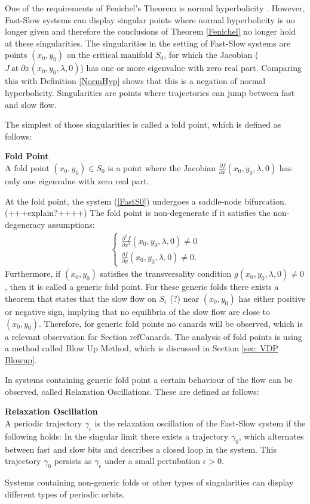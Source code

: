 
One of the requirements of Fenichel's Theorem is normal hyperbolicity \citep{Kuehn}. However, Fast-Slow systems can display singular points where normal hyperbolicity is no longer given and therefore the conclusions of Theorem \ref{Fenichel} no longer hold at these singularities.
The singularities in the setting of Fast-Slow systems are points $(x_0,y_0)$ on the critical manifold $S_0$, for which the Jacobian ($ J \ \text{at} \ {\partial x}(x_0,y_0, \lambda, 0)$) has one or more eigenvalue with zero real part. Comparing this with Definition \ref{NormHyp} shows that this is a negation of normal hyperbolicity. Singularities are points where trajectories can jump between fast and slow flow. 

The simplest of those singularities is called a fold point, which is defined as follows:
\begin{definition}{\textbf{Fold Point}} \label{FoldDef} \\
A fold point $(x_0,y_0) \in S_0$ is a point where the Jacobian $ \frac{\partial f}{\partial x}(x_0,y_0, \lambda, 0)$ has only one eigenvalue with zero real part.
\end{definition}
At the fold point, the system (\ref{FastS0}) undergoes a saddle-node bifurcation. (+++explain?++++)
The fold point is non-degenerate if it satisfies the non-degeneracy assumptions:
\begin{align} \label{NonDeg}
\begin{cases}
\frac{ \partial ^2 f}{ \partial x^2} (x_0,y_0, \lambda, 0) \neq 0 \\
\frac{\partial f}{\partial y}(x_0,y_0, \lambda, 0) \neq 0.
\end{cases}
\end{align}
Furthermore, if $(x_0,y_0)$ satisfies the transversality condition $g(x_0,y_0, \lambda, 0) \neq 0$, then it is called a generic fold point.
For these generic folds there exists a theorem that states that the slow flow on $S_\epsilon$ (?) near $(x_0,y_0)$ has either positive or negative sign, implying that no equilibria of the slow flow are close to $(x_0,y_0)$. Therefore, for generic fold points no canards will be observed, which is a relevant observation for Section ref{Canards}.
The analysis of fold points is using a method called Blow Up Method, which is discussed in Section \ref{sec: VDP Blowup}.

In systems containing generic fold point a certain behaviour of the flow can be observed, called Relaxation Oscillations. These are defined as follows:
\begin{definition}{\textbf{Relaxation Oscillation}}\\
A periodic trajectory $\gamma_\epsilon$ is the relaxation oscillation of the Fast-Slow system if the following holds:
In the singular limit there exists a trajectory $\gamma_0$, which alternates between fast and slow bits and describes a closed loop in the system. This trajectory $\gamma_0$ persists as $\gamma_\epsilon$ under a small pertubation $\epsilon >0$.
\end{definition} 
Systems containing non-generic folds or other types of singularities can display different types of periodic orbits.
